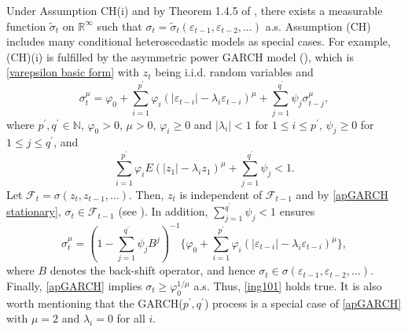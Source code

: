 \documentclass[ejsv2]{imsart}
\theoremstyle{plain}
\theoremstyle{definition}
\theoremstyle{remark}
\begin{document}
Under Assumption CH(i) and by
Theorem 1.4.5 of \cite{Chow1997}, there exists a measurable function
$\tilde{\sigma}_{t}$ on $\mathbb{R}^\infty$ such that
$\sigma_t=\tilde{\sigma}_{t}(\varepsilon_{t-1},\varepsilon_{t-2},\ldots)$ a.s. 
Assumption (CH) includes
many conditional heteroscedastic models
as special cases.
For example, (CH)(i) is fulfilled by the asymmetric power GARCH model (\cite{Ding1993}),
which is \eqref{varepsilon basic form} with $z_t$ being i.i.d. random variables and
\begin{equation}\label{apGARCH}
 \sigma_t^\mu=  \varphi_{0}+\sum_{i=1}^{p^\prime}\varphi_{i}(|\varepsilon_{t-i}|-\lambda_i\varepsilon_{t-i})^\mu+\sum_{j=1}^{q^\prime}\psi_{j}\sigma_{t-j}^\mu,
\end{equation}
where $p^\prime,q^\prime\in\mathbb{N}$, $\varphi_{0}>0$, $\mu>0$, $\varphi_{i}\geq0$ and
$|\lambda_i|<1$ for $1\leq i \leq p^\prime$,
$\psi_{j} \geq 0$ for $1\leq j \leq q^\prime$, and
\begin{equation}\label{apGARCH stationary}
\sum_{i=1}^{p^\prime}\varphi_{i}E(|z_1|-\lambda_i z_1)^\mu+\sum_{j=1}^{q^\prime}\psi_{j}<1.
\end{equation}
Let $\mathcal{F}_{t}=\sigma(z_{t},z_{t-1},\ldots)$.
Then, %
$z_t$ is independent of
$\mathcal{F}_{t-1}$
and by
\eqref{apGARCH stationary}, $\sigma_t \in\mathcal{F}_{t-1}$ (see  \cite{Ling2002}).
In addition,
$\sum_{j=1}^{q^\prime}\psi_{j}<1$ ensures
\begin{equation}\label{sigma is a function of lag variables}
\sigma_t^\mu=(1-\sum_{j=1}^{q^\prime}\psi_{j}B^j)^{-1}\{\varphi_{0}+\sum_{i=1}^{p^\prime}\varphi_{i}(|\varepsilon_{t-i}|-\lambda_i\varepsilon_{t-i})^\mu\},
\end{equation}
where $B$ denotes the back-shift operator,
and hence
$\sigma_t\in\sigma(\varepsilon_{t-1},\varepsilon_{t-2},\ldots)$.
Finally, \eqref{apGARCH} implies
$\sigma_t\geq \varphi_{0}^{1/\mu}$ a.s.
Thus, \eqref{ing101} holds true.
It is also worth mentioning that the
GARCH($p^\prime,q^\prime$) process is a special case of \eqref{apGARCH}
with
$\mu=2$ and $\lambda_i=0$ for all $i$.
\end{document}
